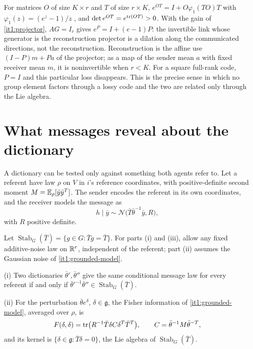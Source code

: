 \documentclass[11pt,letterpaper]{report}
\newcommand{\Stab}{\operatorname{Stab}}
\begin{document}
For matrices $O$ of size $K\times r$ and $T$ of size $r\times K$, $e^{OT}=I+O\varphi_1(TO)T$ with $\varphi_1(z)=(e^z-1)/z$ \citep[Section~1.8]{Higham2008}, and $\det e^{OT}=e^{\operatorname{tr}(OT)}>0$. With the gain of \cref{it1:projector}, $AG=I_r$ gives $e^{P}=I+(e-1)P$: the invertible link whose generator is the reconstruction projector is a dilation along the communicated directions, not the reconstruction. Reconstruction is the affine use $(I-P)m+Pa$ of the projector; as a map of the sender mean $a$ with fixed receiver mean $m$, it is noninvertible when $r<K$. For a square full-rank code, $P=I$ and this particular loss disappears. This is the precise sense in which no group element factors through a lossy code and the two are related only through the Lie algebra.

\chapter{What messages reveal about the dictionary}
\label{it1:ch-identifiability}

A dictionary can be tested only against something both agents refer to. Let a referent have law $\rho$ on $V$ in $i$'s reference coordinates, with positive-definite second moment $M=\mathbb E_\rho[\bar y\bar y^T]$. The sender encodes the referent in its own coordinates, and the receiver models the message as
\begin{equation}
h\mid\bar y\sim\mathcal N\bigl(\bar T\bar\theta^{-1}\bar y,R\bigr),
\label{it1:grounded-model}
\end{equation}
with $R$ positive definite.

Let $\Stab_G(\bar T)=\{g\in G:\bar Tg=\bar T\}$. For parts (i) and (iii), allow any fixed additive-noise law on $\mathbb R^r$, independent of the referent; part (ii) assumes the Gaussian noise of \cref{it1:grounded-model}.

\textup{(i)} Two dictionaries $\bar\theta',\bar\theta''$ give the same conditional message law for every referent if and only if $\bar\theta'^{-1}\bar\theta''\in\Stab_G(\bar T)$.

\textup{(ii)} For the perturbation $\bar\theta e^{\delta}$, $\delta\in\mathfrak g$, the Fisher information of \cref{it1:grounded-model}, averaged over $\rho$, is
\begin{equation}
F(\delta,\delta)=\operatorname{tr}\bigl(R^{-1}\bar T\delta C\delta^T\bar T^T\bigr),\qquad C=\bar\theta^{-1}M\bar\theta^{-T},
\label{it1:fisher}
\end{equation}
and its kernel is $\{\delta\in\mathfrak g:\bar T\delta=0\}$, the Lie algebra of $\Stab_G(\bar T)$.
\end{document}
